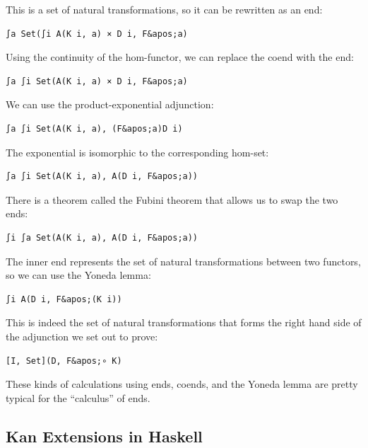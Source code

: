 This is a set of natural transformations, so it can be rewritten as an
end:

\begin{verbatim}
∫a Set(∫i A(K i, a) × D i, F&apos;a)
\end{verbatim}

Using the continuity of the hom-functor, we can replace the coend with
the end:

\begin{verbatim}
∫a ∫i Set(A(K i, a) × D i, F&apos;a)
\end{verbatim}

We can use the product-exponential adjunction:

\begin{verbatim}
∫a ∫i Set(A(K i, a), (F&apos;a)D i)
\end{verbatim}

The exponential is isomorphic to the corresponding hom-set:

\begin{verbatim}
∫a ∫i Set(A(K i, a), A(D i, F&apos;a))
\end{verbatim}

There is a theorem called the Fubini theorem that allows us to swap the
two ends:

\begin{verbatim}
∫i ∫a Set(A(K i, a), A(D i, F&apos;a))
\end{verbatim}

The inner end represents the set of natural transformations between two
functors, so we can use the Yoneda lemma:

\begin{verbatim}
∫i A(D i, F&apos;(K i))
\end{verbatim}

This is indeed the set of natural transformations that forms the right
hand side of the adjunction we set out to prove:

\begin{verbatim}
[I, Set](D, F&apos;∘ K)
\end{verbatim}

These kinds of calculations using ends, coends, and the Yoneda lemma are
pretty typical for the ``calculus'' of ends.

\subsection{Kan Extensions in Haskell}\label{kan-extensions-in-haskell}

